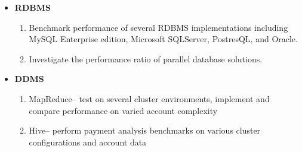 \begin{itemize}
 \item \textbf{RDBMS}
  \begin{enumerate}
   \item Benchmark performance of several RDBMS implementations including MySQL Enterprise edition, Microsoft SQLServer, PostresQL, and Oracle.
   \item Investigate the performance ratio of parallel database solutions.
  \end{enumerate}
 \item \textbf{DDMS}
  \begin{enumerate}
   \item MapReduce-- test on several cluster environments, implement and compare performance on varied account complexity
   \item Hive-- perform payment analysis benchmarks on various cluster configurations and account data
  \end{enumerate}
\end{itemize}